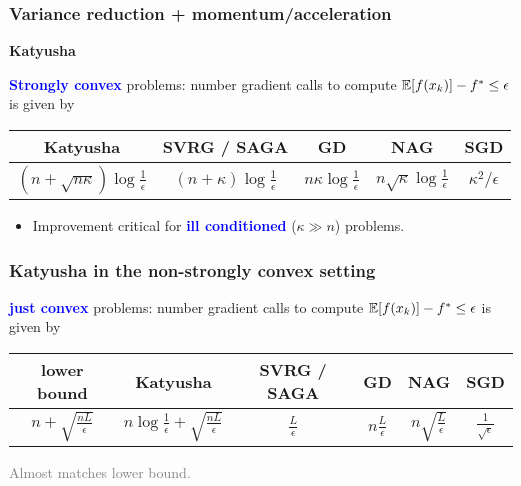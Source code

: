 \documentclass[aspectratio=149]{beamer}
\begin{document}
\begin{frame}
  \frametitle{Variance reduction + momentum/acceleration}
  \begin{block}{}
    \centering
    \textbf{Katyusha}
  \end{block}

  \textbf{\textcolor{blue}{Strongly convex}} problems: number gradient calls to compute $\mathbb{E} [f(x_k)] - f^* \le \epsilon$ is given by
  \begin{center}
  \begin{tabular}{c c c c c}
    Katyusha & SVRG / SAGA  & GD & NAG & SGD \\
    \midrule
    $(n + \sqrt{n \kappa}) \log \frac{1}{\epsilon}$ &$(n + \kappa) \log \frac{1}{\epsilon}$ & $n \kappa \log \frac{1}{\epsilon}$ & $n \sqrt{\kappa} \log \frac{1}{\epsilon}$ & $\kappa^2 / \epsilon$
  \end{tabular}
  \end{center}
  \vspace{1cm}
  \begin{itemize}
    \item Improvement critical for \textbf{\textcolor{blue}{ill conditioned}} ($\kappa \gg n$) problems.
  \end{itemize}


\end{frame}


\begin{frame}
  \frametitle{Katyusha in the non-strongly convex setting}
  \textbf{\textcolor{blue}{just convex}} problems: number gradient calls to compute $\mathbb{E} [f(x_k)] - f^* \le \epsilon$ is given by
  \begin{center}
  \begin{tabular}{c c c c c c}
    lower bound & Katyusha & SVRG / SAGA  & GD & NAG & SGD \\
    \midrule
    $n + \sqrt{\frac{n L}{\epsilon}}$ & $n \log \frac{1}{\epsilon} + \sqrt{\frac{n L}{\epsilon}}$ &$\frac{L}{\epsilon}$ & $n \frac{L}{\epsilon}$ & $n \sqrt{\frac{L}{\epsilon}}$ & $ \frac{1}{\sqrt{\epsilon}}$
  \end{tabular}
  \end{center}
  \vspace{1cm}
  \textcolor{gray}{Almost matches lower bound.}

\end{frame}
\end{document}
